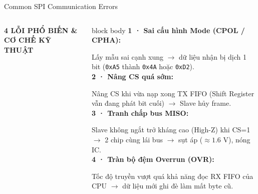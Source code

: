 \documentclass[10pt,aspectratio=169]{beamer}
\begin{document}
\begin{frame}[shrink=4]{Common SPI Communication Errors}
\transfade[duration=.35]
\vspace{-.2cm}
\begin{columns}[T,onlytextwidth]
{\color{cyan}\bfseries 4 LỖI PHỔ BIẾN \& CƠ CHẾ KỸ THUẬT}\par\vspace{.12cm}
\begin{beamercolorbox}[rounded=true,sep=5pt]{block body}
{\color{red}\bfseries 1 · Sai cấu hình Mode (CPOL / CPHA):}\par
{\footnotesize Lấy mẫu sai cạnh xung $\rightarrow$ dữ liệu nhận bị dịch 1 bit (\texttt{0xA5} thành \texttt{0x4A} hoặc \texttt{0xD2}).}\\[3pt]
{\color{orange}\bfseries 2 · Nâng CS quá sớm:}\par
{\footnotesize Nâng CS khi vừa nạp xong TX FIFO (Shift Register vẫn đang phát bit cuối) $\rightarrow$ Slave hủy frame.}\\[3pt]
{\color{blue}\bfseries 3 · Tranh chấp bus MISO:}\par
{\footnotesize Slave không ngắt trở kháng cao (High-Z) khi CS=1 $\rightarrow$ 2 chip cùng lái bus $\rightarrow$ sụt áp ($\approx 1.6\text{ V}$), nóng IC.}\\[3pt]
{\color{green}\bfseries 4 · Tràn bộ đệm Overrun (OVR):}\par
{\footnotesize Tốc độ truyền vượt quá khả năng đọc RX FIFO của CPU $\rightarrow$ dữ liệu mới ghi đè làm mất byte cũ.}
\end{beamercolorbox}


\end{columns}
\end{frame}
\end{document}
